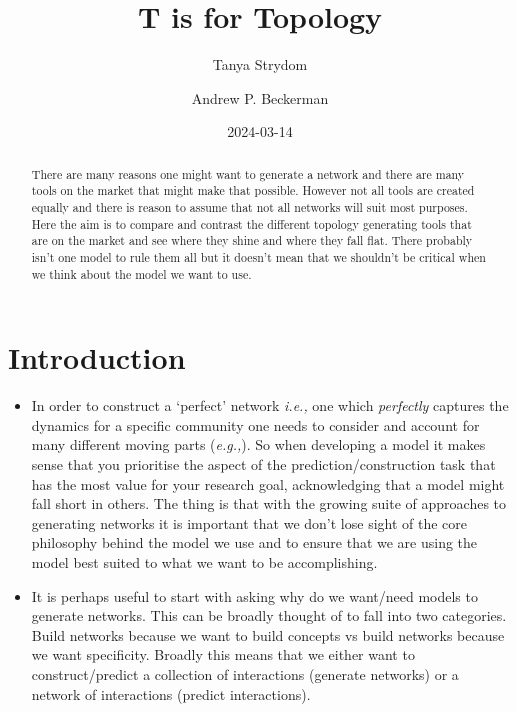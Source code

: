 \documentclass[
  letterpaper,
  DIV=11,
  numbers=noendperiod]{scrartcl}
\title{T is for Topology}
\author{Tanya Strydom \and Andrew P. Beckerman}
\date{2024-03-14}
\begin{document}
\maketitle
\begin{abstract}
There are many reasons one might want to generate a network and there
are many tools on the market that might make that possible. However not
all tools are created equally and there is reason to assume that not all
networks will suit most purposes. Here the aim is to compare and
contrast the different topology generating tools that are on the market
and see where they shine and where they fall flat. There probably isn't
one model to rule them all but it doesn't mean that we shouldn't be
critical when we think about the model we want to use.
\end{abstract}

\section{Introduction}\label{introduction}

\begin{itemize}
\item
  In order to construct a `perfect' network \emph{i.e.,} one which
  \emph{perfectly} captures the dynamics for a specific community one
  needs to consider and account for many different moving parts
  (\emph{e.g.,}). So when developing a model it makes sense that you
  prioritise the aspect of the prediction/construction task that has the
  most value for your research goal, acknowledging that a model might
  fall short in others. The thing is that with the growing suite of
  approaches to generating networks it is important that we don't lose
  sight of the core philosophy behind the model we use and to ensure
  that we are using the model best suited to what we want to be
  accomplishing.
\item
  It is perhaps useful to start with asking why do we want/need models
  to generate networks. This can be broadly thought of to fall into two
  categories. Build networks because we want to build concepts vs build
  networks because we want specificity. Broadly this means that we
  either want to construct/predict a collection of interactions
  (generate networks) or a network of interactions (predict
  interactions).
\end{itemize}
\end{document}
